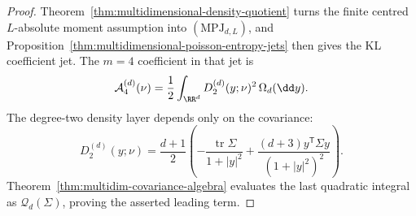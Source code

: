 \begin{proof}
Theorem~\ref{thm:multidimensional-density-quotient} turns the finite centred
\(L\)-absolute moment assumption into \((\mathrm{MPJ}_{d,L})\), and
Proposition~\ref{thm:multidimensional-poisson-entropy-jets} then gives the KL
coefficient jet.  The \(m=4\) coefficient in that jet is
\[
\mathcal A_4^{(d)}(\nu)
=\frac12\int_{\RR^d}D_2^{(d)}(y;\nu)^2\,\Omega_d(\dd y).
\]
The degree-two density layer depends only on the covariance:
\[
D_2^{(d)}(y;\nu)=
\frac{d+1}{2}\left(
-\frac{\operatorname{tr}\Sigma}{1+|y|^2}
+\frac{(d+3)y^{\mathsf T}\Sigma y}{(1+|y|^2)^2}
\right).
\]
Theorem~\ref{thm:multidim-covariance-algebra} evaluates the last
quadratic integral as \(\mathcal Q_d(\Sigma)\), proving the asserted leading
term.
\end{proof}
\fi
